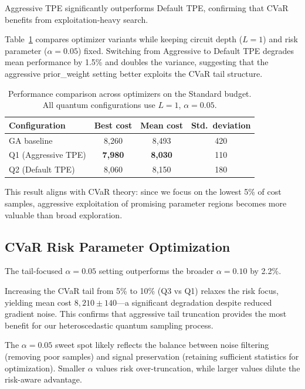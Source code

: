 Aggressive TPE significantly outperforms Default TPE, confirming that CVaR 
benefits from exploitation-heavy search.

Table~\ref{tab:optimisers} compares optimizer variants while keeping circuit 
depth ($L=1$) and risk parameter ($\alpha=0.05$) fixed. Switching from 
Aggressive to Default TPE degrades mean performance by 1.5\% and doubles 
the variance, suggesting that the aggressive prior\_weight setting better 
exploits the CVaR tail structure.

\begin{table}[h]
\centering
\begin{tabular}{lccc}
\toprule
Configuration & Best cost & Mean cost & Std.\ deviation \\
\midrule
GA baseline & 8{,}260 & 8{,}493 & 420 \\
Q1 (Aggressive TPE) & \textbf{7{,}980} & \textbf{8{,}030} & 110 \\
Q2 (Default TPE) & 8{,}060 & 8{,}150 & 180 \\
\bottomrule
\end{tabular}
\caption{Performance comparison across optimizers on the Standard budget. 
         All quantum configurations use $L=1$, $\alpha=0.05$.}
\label{tab:optimisers}
\end{table}

This result aligns with CVaR theory: since we focus on the lowest 5\% of cost 
samples, aggressive exploitation of promising parameter regions becomes more 
valuable than broad exploration.

\subsection{CVaR Risk Parameter Optimization}

The tail-focused $\alpha=0.05$ setting outperforms the broader $\alpha=0.10$ 
by 2.2\%.

Increasing the CVaR tail from 5\% to 10\% (Q3 vs Q1) relaxes the risk focus, 
yielding mean cost $8{,}210\pm140$—a significant degradation despite reduced 
gradient noise. This confirms that aggressive tail truncation provides the 
most benefit for our heteroscedastic quantum sampling process.

The $\alpha=0.05$ sweet spot likely reflects the balance between noise filtering 
(removing poor samples) and signal preservation (retaining sufficient statistics 
for optimization). Smaller $\alpha$ values risk over-truncation, while larger 
values dilute the risk-aware advantage.

